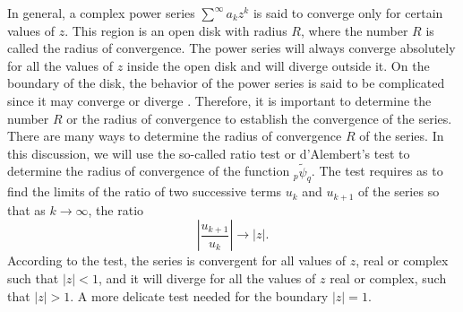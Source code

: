 In general, a complex power series $\sum^{\infty} a_k z^k$ is said to converge only for certain values of $z$. This region is an open disk with radius $R$, where the number $R$ is called the radius of convergence. The power series will always converge absolutely for all the values of $z$ inside the open disk and will diverge outside it. On the boundary of the disk, the behavior of the power series is said to be complicated since it may converge or diverge \cite{hardy1940ramaniyan}. Therefore, it is important to determine the number $R$ or the radius of convergence to establish the convergence of the series. There are many ways to determine the radius of convergence $R$ of the series. In this discussion, we will use the so-called ratio test or d'Alembert's test to determine the radius of convergence of the function ${}_{p}\tilde{\psi}_q$. The test requires as to find the limits of the ratio of two successive terms $u_k$ and $u_{k+1}$ of the series so that as $k \to \infty$, the ratio 
\begin{equation}
    \left| \frac{u_{k+1}}{u_k} \right| \to \left| z \right|.
\end{equation}
According to the test, the series is convergent for all values of $z$, real or complex such that $|z| < 1$, and it will diverge for all the values of $z$ real or complex, such that $|z| > 1$. A more delicate test needed for the boundary $|z| = 1$. 

